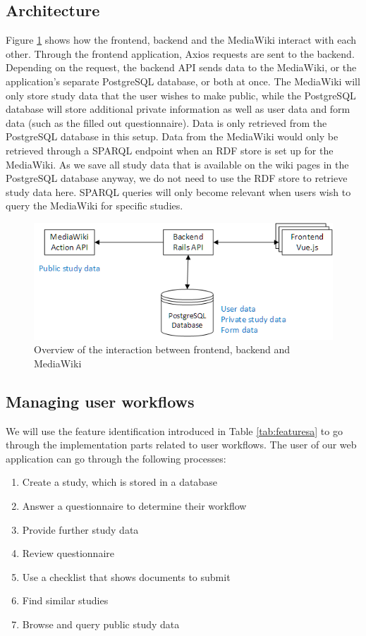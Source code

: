 \documentclass[10pt]{article}
\begin{document}
\subsection{Architecture}
Figure \ref{wikibackfront} shows how the frontend, backend and the MediaWiki interact with each other. Through the frontend application, Axios requests are sent to the backend. Depending on the request, the backend API sends data to the MediaWiki, or the application's separate PostgreSQL database, or both at once. The MediaWiki will only store study data that the user wishes to make public, while the PostgreSQL database will store additional private information as well as user data and form data (such as the filled out questionnaire). Data is only retrieved from the PostgreSQL database in this setup. Data from the MediaWiki would only be retrieved through a SPARQL endpoint when an RDF store is set up for the MediaWiki. As we save all study data that is available on the wiki pages in the PostgreSQL database anyway, we do not need to use the RDF store to retrieve study data here. SPARQL queries will only become relevant when users wish to query the MediaWiki for specific studies.
\begin{figure}
	\includegraphics[width=1\textwidth]{img/wikibackfront.png}
	\caption{Overview of the interaction between frontend, backend and MediaWiki}
	\label{wikibackfront}
\end{figure}	

\subsection{Managing user workflows}
We will use the feature identification introduced in Table \ref{tab:featuresa} to go through the implementation parts related to user workflows. The user of our web application can go through the following processes:
\begin{enumerate}
\item Create a study, which is stored in a database
\item Answer a questionnaire to determine their workflow
\item Provide further study data
\item Review questionnaire
\item Use a checklist that shows documents to submit
\item Find similar studies
\item Browse and query public study data
\end{enumerate}
\end{document}
